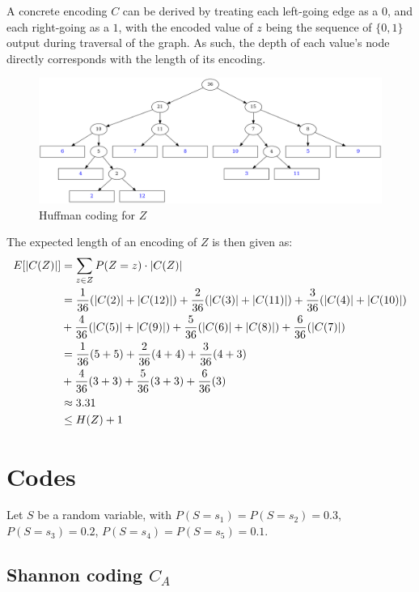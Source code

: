 \documentclass[a4paper]{scrreprt}
\DeclarePairedDelimiter\abs{\lvert}{\rvert}
\begin{document}
A concrete encoding $C$ can be derived by treating each left-going edge as a $0$,
and each right-going as a $1$, with the encoded value of $z$ being the sequence
of $\{0, 1\}$ output during traversal of the graph. As such, the depth of each
value's node directly corresponds with the length of its encoding.

\begin{figure}
	\centering
	\includegraphics[width=\linewidth]{graphs/huffman_1.png}
	\caption{Huffman coding for $Z$}
	\label{fig:huffman_coding}
\end{figure}

The expected length of an encoding of $Z$ is then given as:
\begin{align*}
	E[\abs{C(Z)}] & = \sum_{z \in Z}{P(Z = z) \cdot \abs{C(Z)}} \\
	& = \frac{1}{36} (\abs{C(2)} + \abs{C(12)}) 
	+ \frac{2}{36} (\abs{C(3)} + \abs{C(11)}) 
	+ \frac{3}{36} (\abs{C(4)} + \abs{C(10)}) \\
	& + \frac{4}{36} (\abs{C(5)} + \abs{C(9)})
	+ \frac{5}{36} (\abs{C(6)} + \abs{C(8)})
	+ \frac{6}{36} (\abs{C(7)}) \\
	& = \frac{1}{36} (5 + 5)
	+ \frac{2}{36} (4 + 4)
	+ \frac{3}{36} (4 + 3) \\
	& + \frac{4}{36} (3 + 3)
	+ \frac{5}{36} (3 + 3)
	+ \frac{6}{36} (3) \\
	& \approx 3.31 \\
	& \leq H(Z) + 1
\end{align*}

\section{Codes}

Let $S$ be a random variable, with $P(S = s_1) = P(S = s_2) = 0.3$, $P(S = s_3)
= 0.2$, $P(S = s_4) = P(S = s_5) = 0.1$.

\subsection{Shannon coding $C_A$}
\end{document}
